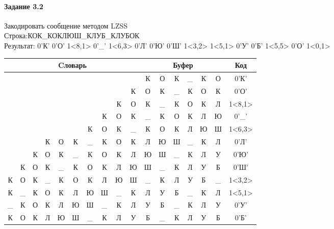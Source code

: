\documentclass[a4paper, 12pt]{article}
\begin{document}
\paragraph{Задание 3.2}

Закодировать сообщение методом LZSS\\
Строка:КОК\_КОКЛЮШ\_КЛУБ\_КЛУБОК\\
Результат: 0'К' 0'О' 1<8,1> 0'\_' 1<6,3> 0'Л' 0'Ю' 0'Ш' 1<3,2> 1<5,1> 0'У' 0'Б' 1<5,5> 0'О' 1<0,1>\\
\begin{table}[h!]
\centering
\begin{tabular}{|c|c|c|c|c|c|c|c|c|c|c|c|c|c|c|c|c|}
\hline
\multicolumn{10}{|c|}{Cловарь} & \multicolumn{6}{c|}{Буфер} & Код  \\ \hline
  &   &   &   &   &   &   &   &   &   & К & О & К & \_ & К & О & 0'К'\\ \hline
  &   &   &   &   &   &   &   &   & К & О & К & \_ & К & О & К & 0'О'\\ \hline
  &   &   &   &   &   &   &   & \cellcolor[HTML]{FFFF00} К & О & \cellcolor[HTML]{FFFF00} К & \_ & К & О & К & Л & 1<8,1>\\ \hline
  &   &   &   &   &   &   & К & О & К & \_ & К & О & К & Л & Ю & 0'\_'\\ \hline
  &   &   &   &   &   & \cellcolor[HTML]{FFFF00} К & \cellcolor[HTML]{FFFF00} О & \cellcolor[HTML]{FFFF00} К & \_ & \cellcolor[HTML]{FFFF00} К & \cellcolor[HTML]{FFFF00} О & \cellcolor[HTML]{FFFF00} К & Л & Ю & Ш & 1<6,3>\\ \hline
  &   &   & К & О & К & \_ & К & О & К & Л & Ю & Ш & \_ & К & Л & 0'Л'\\ \hline
  &   & К & О & К & \_ & К & О & К & Л & Ю & Ш & \_ & К & Л & У & 0'Ю'\\ \hline
  & К & О & К & \_ & К & О & К & Л & Ю & Ш & \_ & К & Л & У & Б & 0'Ш'\\ \hline
К & О & К & \cellcolor[HTML]{FFFF00} \_ & \cellcolor[HTML]{FFFF00} К & О & К & Л & Ю & Ш & \cellcolor[HTML]{FFFF00} \_ & \cellcolor[HTML]{FFFF00} К & Л & У & Б & \_ & 1<3,2>\\ \hline
К & \_ & К & О & К & \cellcolor[HTML]{FFFF00} Л & Ю & Ш & \_ & К & \cellcolor[HTML]{FFFF00} Л & У & Б & \_ & К & Л & 1<5,1>\\ \hline
\_ & К & О & К & Л & Ю & Ш & \_ & К & Л & У & Б & \_ & К & Л & У & 0'У'\\ \hline
К & О & К & Л & Ю & Ш & \_ & К & Л & У & Б & \_ & К & Л & У & Б & 0'Б'\\ \hline

\end{tabular}
\end{table}
\end{document}
